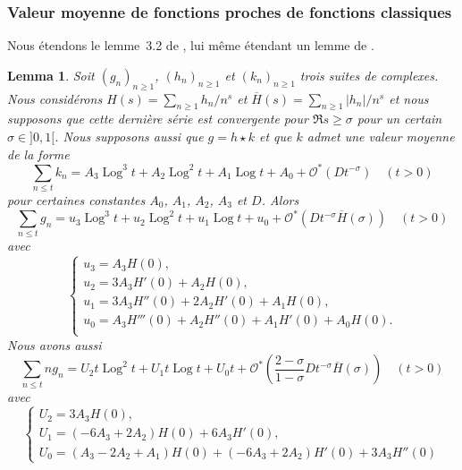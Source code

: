 \documentclass[12pt,a4paper,twoside]{article}
\newtheorem{lem}{Lemma}[section]
\def\Ocal{\mathcal{O}}
\DeclareMathOperator{\Log}{Log}
\begin{document}
\subsubsection{Valeur moyenne de fonctions proches de fonctions classiques}

Nous \'etendons le lemme~3.2 de \cite{Ramare}, lui m\^eme \'etendant un lemme
de \cite{Riesel-Vaughan*83}.

\begin{lem}
  Soit $(g_n)_{n\ge1}$, $(h_n)_{n\ge1}$ et $(k_n)_{n\ge1}$ trois suites de
  complexes. Nous consid\'erons $H(s)=\sum_{n\ge1}h_n/n^s$ et
  $\overline{H}(s)=\sum_{n\ge1}|h_n|/n^s$ et nous supposons que cette
  derni\`ere s\'erie est convergente pour $\Re s\ge \sigma$ pour un certain
  $\sigma\in]0,1[$. Nous supposons aussi  que $g=h\star k$ et que $k$ admet une
  valeur moyenne de la forme
  \begin{equation*}
    \sum_{n\le t}k_n=A_{3}\Log^3t+A_{2}\Log^2t+A_{1}\Log t+A_0+\Ocal^*(D
    t^{-\sigma})
    \quad(t>0)
  \end{equation*}
  pour certaines constantes $A_0$, $A_1$, $A_2$, $A_3$ et $D$. Alors
   \begin{equation*}
    \sum_{n\le t}g_n=u_{3}\Log^3t+u_{2}\Log^2t+u_{1}\Log t+u_0+\Ocal^*(D
    t^{-\sigma}\overline{H}(\sigma))
    \quad(t>0)
  \end{equation*}
  avec
  \begin{equation*}
    \left\{
      \begin{array}{r}
        u_3=A_3H(0),\\
        u_2=3A_3H'(0)+A_2H(0),\\
        u_1=3A_3H''(0)+2A_2H'(0)+A_1H(0),\\
        u_0=A_3H'''(0)+A_2H''(0)+A_1H'(0)+A_0H(0).\\
     \end{array}
    \right.
  \end{equation*}
  Nous avons aussi
     \begin{equation*}
    \sum_{n\le t}ng_n=U_{2}t\Log^2t+U_{1}t\Log t+U_{0}t+\Ocal^*(\frac{2-\sigma}{1-\sigma}D
    t^{-\sigma}\overline{H}(\sigma))
    \quad(t>0)
  \end{equation*}
  avec
  \begin{equation*}
    \left\{
      \begin{array}{r}
        U_2=3A_3H(0),\\
        U_1=(-6A_3+2A_2)H(0)+6A_3H'(0),\\
        U_0=(A_3-2A_2+A_1)H(0)+(-6A_3+2A_2)H'(0)+3A_3H''(0)
     \end{array}
    \right.
  \end{equation*}
\end{lem}
\end{document}
